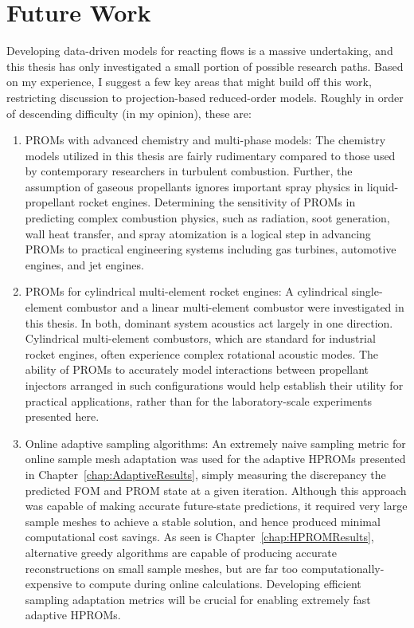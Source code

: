 \section{Future Work}

Developing data-driven models for reacting flows is a massive undertaking, and this thesis has only investigated a small portion of possible research paths. Based on my experience, I suggest a few key areas that might build off this work, restricting discussion to projection-based reduced-order models. Roughly in order of descending difficulty (in my opinion), these are:

\begin{enumerate}
    \item PROMs with advanced chemistry and multi-phase models: The chemistry models utilized in this thesis are fairly rudimentary compared to those used by contemporary researchers in turbulent combustion. Further, the assumption of gaseous propellants ignores important spray physics in liquid-propellant rocket engines. Determining the sensitivity of PROMs in predicting complex combustion physics, such as radiation, soot generation, wall heat transfer, and spray atomization is a logical step in advancing PROMs to practical engineering systems including gas turbines, automotive engines, and jet engines.
    \item PROMs for cylindrical multi-element rocket engines: A cylindrical single-element combustor and a linear multi-element combustor were investigated in this thesis. In both, dominant system acoustics act largely in one direction. Cylindrical multi-element combustors, which are standard for industrial rocket engines, often experience complex rotational acoustic modes. The ability of PROMs to accurately model interactions between propellant injectors arranged in such configurations would help establish their utility for practical applications, rather than for the laboratory-scale experiments presented here.
    \item Online adaptive sampling algorithms: An extremely naive sampling metric for online sample mesh adaptation was used for the adaptive HPROMs presented in Chapter~\ref{chap:AdaptiveResults}, simply measuring the discrepancy the predicted FOM and PROM state at a given iteration. Although this approach was capable of making accurate future-state predictions, it required very large sample meshes to achieve a stable solution, and hence produced minimal computational cost savings. As seen is Chapter~\ref{chap:HPROMResults}, alternative greedy algorithms are capable of producing accurate reconstructions on small sample meshes, but are far too computationally-expensive to compute during online calculations. Developing efficient sampling adaptation metrics will be crucial for enabling extremely fast adaptive HPROMs.

\end{enumerate}
